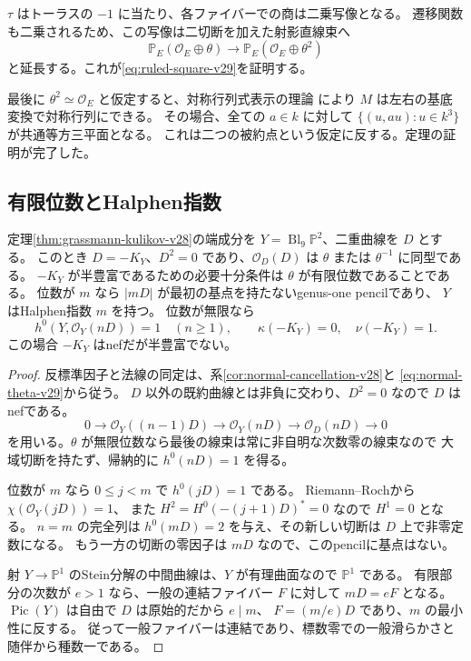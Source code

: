 $\tau$ はトーラスの $-1$ に当たり、各ファイバーでの商は二乗写像となる。
遷移関数も二乗されるため、この写像は二切断を加えた射影直線束へ
\[
 \mathbb P_E(\mathcal O_E\oplus\theta)
 \longrightarrow\mathbb P_E(\mathcal O_E\oplus\theta^2)
\]
と延長する。これが\eqref{eq:ruled-square-v29}を証明する。

最後に $\theta^2\simeq\mathcal O_E$ と仮定すると、対称行列式表示の理論
\cite[Theorem~B and Corollary~2.4]{BeauvilleDeterminantal}により
$M$ は左右の基底変換で対称行列にできる。
その場合、全ての $a\in k$ に対して $\{(u,au):u\in k^3\}$ が共通等方三平面となる。
これは二つの被約点という仮定に反する。定理の証明が完了した。

\subsection{有限位数とHalphen指数}

\begin{proposition}[有理端成分の半豊富性の判定]
\label{prop:halphen-torsion-v29}
定理\ref{thm:grassmann-kulikov-v28}の端成分を
$Y=\operatorname{Bl}_9\mathbb P^2$、二重曲線を $D$ とする。
このとき $D=-K_Y$、$D^2=0$ であり、$\mathcal O_D(D)$ は
$\theta$ または $\theta^{-1}$ に同型である。
$-K_Y$ が半豊富であるための必要十分条件は $\theta$ が有限位数であることである。
位数が $m$ なら $|mD|$ が最初の基点を持たないgenus-one pencilであり、
$Y$ はHalphen指数 $m$ を持つ。
位数が無限なら
\[
 h^0(Y,\mathcal O_Y(nD))=1\quad(n\ge1),
 \qquad\kappa(-K_Y)=0,\quad\nu(-K_Y)=1.
\]
この場合 $-K_Y$ はnefだが半豊富でない。
\end{proposition}

\begin{proof}
反標準因子と法線の同定は、系\ref{cor:normal-cancellation-v28}と
\eqref{eq:normal-theta-v29}から従う。
$D$ 以外の既約曲線とは非負に交わり、$D^2=0$ なので $D$ はnefである。
\[
 0\longrightarrow\mathcal O_Y((n-1)D)\longrightarrow
 \mathcal O_Y(nD)\longrightarrow\mathcal O_D(nD)\longrightarrow0
\]
を用いる。$\theta$ が無限位数なら最後の線束は常に非自明な次数零の線束なので
大域切断を持たず、帰納的に $h^0(nD)=1$ を得る。

位数が $m$ なら $0\le j<m$ で $h^0(jD)=1$ である。
Riemann--Rochから $\chi(\mathcal O_Y(jD))=1$、
また $H^2=H^0(-(j+1)D)^*=0$ なので $H^1=0$ となる。
$n=m$ の完全列は $h^0(mD)=2$ を与え、その新しい切断は $D$ 上で非零定数になる。
もう一方の切断の零因子は $mD$ なので、このpencilに基点はない。

射 $Y\to\mathbb P^1$ のStein分解の中間曲線は、$Y$ が有理曲面なので $\mathbb P^1$ である。
有限部分の次数が $e>1$ なら、一般の連結ファイバー $F$ に対して $mD=eF$ となる。
$\operatorname{Pic}(Y)$ は自由で $D$ は原始的だから $e\mid m$、
$F=(m/e)D$ であり、$m$ の最小性に反する。
従って一般ファイバーは連結であり、標数零での一般滑らかさと随伴から種数一である。
\end{proof}

